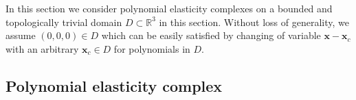 In this section we consider polynomial elasticity complexes on a bounded and topologically trivial domain $D\subset \mathbb R^3$ in this section.
Without loss of generality, we assume $(0,0,0) \in D$ which can be easily satisfied by changing of variable $\boldsymbol  x - \boldsymbol  x_c$ with an arbitrary $\boldsymbol  x_c\in D$ for polynomials in $D$.  



\subsection{Polynomial elasticity complex}


